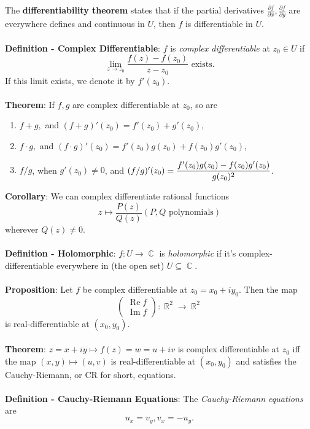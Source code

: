 \documentclass{article}
\DeclareMathOperator{\R}{\mathbb{R}}
\DeclareMathOperator{\C}{\mathbb{C}}
\DeclareMathOperator{\re}{Re}
\DeclareMathOperator{\im}{Im}
\begin{document}
The \textbf{differentiability theorem} states that if the partial derivatives $\frac{\partial f}{\partial x}, \frac{\partial f}{\partial y}$ are everywhere defines and continuous in $U$, then $f$ is differentiable in $U$. \\ \\
\textbf{Definition - Complex Differentiable}: $f$ is \textit{complex differentiable} at $z_0 \in U$ if $$\lim_{z \rightarrow z_0} \frac{f(z) - f(z_0)}{z - z_0} \text{ exists.}$$ If this limit exists, we denote it by $f'(z_0).$ \\ \\
\textbf{Theorem}: If $f, g$ are complex differentiable at $z_0$, so are \begin{enumerate}
    \item $f + g,$ and $(f + g)'(z_0) = f'(z_0) + g'(z_0)$,
    \item $f \cdot g,$ and $(f \cdot g)'(z_0) = f'(z_0)g(z_0) + f(z_0)g'(z_0)$,
    \item $f/g$, when $g'(z_0) \neq 0$, and $(f/g)'(z_0) = \mathlarger{\frac{f'(z_0)g(z_0) - f(z_0)g'(z_0)}{g(z_0)^2}}$.
\end{enumerate} $ $ \\
\textbf{Corollary}: We can complex differentiate rational functions $$z \mapsto \frac{P(z)}{Q(z)} (P, Q \text{ polynomials})$$ wherever $Q(z) \neq 0$. \\ \\
\textbf{Definition - Holomorphic}: $f: U \rightarrow \C$ is \textit{holomorphic} if it's complex-differentiable everywhere in (the open set) $U \subseteq \C$. \\ \\
\textbf{Proposition}: Let $f$ be complex differentiable at $z_0 = x_0 + i y_0$. Then the map $$\begin{pmatrix}
    \re{f} \\
    \im{f}
\end{pmatrix}: \R^2 \rightarrow \R^2$$ is real-differentiable at $(x_0, y_0)$. \\ \\
\textbf{Theorem}: $z = x + iy \mapsto f(z) = w = u + iv$ is complex differentiable at $z_0$ iff the map $(x, y) \mapsto (u, v)$ is real-differentiable at $(x_0, y_0)$ and satisfies the Cauchy-Riemann, or CR for short, equations. \\ \\
\textbf{Definition - Cauchy-Riemann Equations}: The \textit{Cauchy-Riemann equations} are $$u_x = v_y, v_x = -u_y.$$ \\
\end{document}
